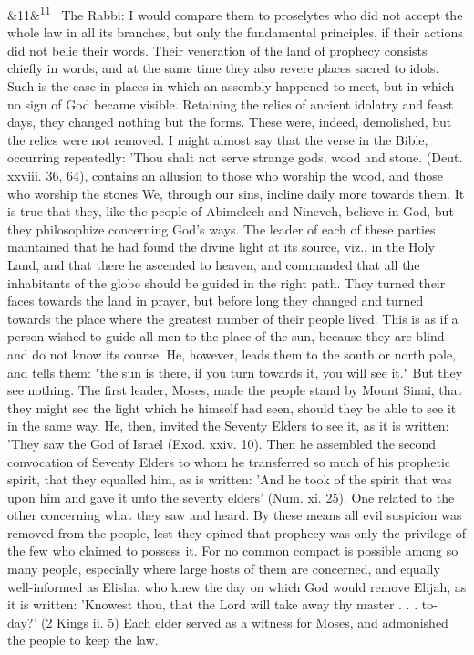 \documentclass[12pt]{article}
\newcommand{\para}[1][]{\par\noindent\ifx&#1&\else\textsuperscript{\footnotesize #1}~\fi}
\begin{document}
\para[11] The Rabbi: I would compare them to proselytes who did not accept the whole law in all its branches, but only the fundamental principles, if their actions did not belie their words. Their veneration of the land of prophecy consists chiefly in words, and at the same time they also revere places sacred to idols. Such is the case in places in which an assembly happened to meet, but in which no sign of God became visible. Retaining the relics of ancient idolatry and feast days, they changed nothing but the forms. These were, indeed, demolished, but the relics were not removed. I might almost say that the verse in the Bible, occurring repeatedly: 'Thou shalt not serve strange gods, wood and stone. (Deut. xxviii. 36, 64), contains an allusion to those who worship the wood, and those who worship the stones We, through our sins, incline daily more towards them. It is true that they, like the people of Abimelech and Nineveh, believe in God, but they philosophize concerning God's ways. The leader of each of these parties maintained that he had found the divine light at its source, viz., in the Holy Land, and that there he ascended to heaven, and commanded that all the inhabitants of the globe should be guided in the right path. They turned their faces towards the land in prayer, but before long they changed and turned towards the place where the greatest number of their people lived. This is as if a person wished to guide all men to the place of the sun, because they are blind and do not know its course. He, however, leads them to the south or north pole, and tells them: "the sun is there, if you turn towards it, you will see it." But they see nothing. The first leader, Moses, made the people stand by Mount Sinai, that they might see the light which he himself had seen, should they be able to see it in the same way. He, then, invited the Seventy Elders to see it, as it is written: 'They saw the God of Israel (Exod. xxiv. 10). Then he assembled the second convocation of Seventy Elders to whom he transferred so much of his prophetic spirit, that they equalled him, as is written: 'And he took of the spirit that was upon him and gave it unto the seventy elders' (Num. xi. 25). One related to the other concerning what they saw and heard. By these means all evil suspicion was removed from the people, lest they opined that prophecy was only the privilege of the few who claimed to possess it. For no common compact is possible among so many people, especially where large hosts of them are concerned, and equally well-informed as Elisha, who knew the day on which God would remove Elijah, as it is written: 'Knowest thou, that the Lord will take away thy master . . . to-day?' (2 Kings ii. 5) Each elder served as a witness for Moses, and admonished the people to keep the law.
\end{document}
